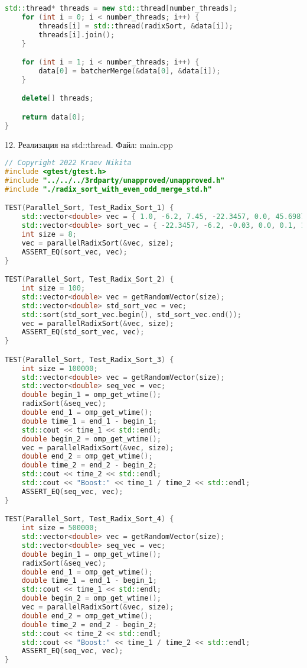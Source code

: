 \documentclass{report}
\begin{document}
\begin{lstlisting}[language=C++]
    std::thread* threads = new std::thread[number_threads];
    for (int i = 0; i < number_threads; i++) {
        threads[i] = std::thread(radixSort, &data[i]);
        threads[i].join();
    }

    for (int i = 1; i < number_threads; i++) {
        data[0] = batcherMerge(&data[0], &data[i]);
    }

    delete[] threads;

    return data[0];
}
\end{lstlisting}

\par 12. Реализация на std::thread. Файл: main.cpp

\begin{lstlisting}[language=C++]
// Copyright 2022 Kraev Nikita
#include <gtest/gtest.h>
#include "../../../3rdparty/unapproved/unapproved.h"
#include "./radix_sort_with_even_odd_merge_std.h"

TEST(Parallel_Sort, Test_Radix_Sort_1) {
    std::vector<double> vec = { 1.0, -6.2, 7.45, -22.3457, 0.0, 45.69876, -0.03, 0.1 };
    std::vector<double> sort_vec = { -22.3457, -6.2, -0.03, 0.0, 0.1, 1.0, 7.45, 45.69876 };
    int size = 8;
    vec = parallelRadixSort(&vec, size);
    ASSERT_EQ(sort_vec, vec);
}

TEST(Parallel_Sort, Test_Radix_Sort_2) {
    int size = 100;
    std::vector<double> vec = getRandomVector(size);
    std::vector<double> std_sort_vec = vec;
    std::sort(std_sort_vec.begin(), std_sort_vec.end());
    vec = parallelRadixSort(&vec, size);
    ASSERT_EQ(std_sort_vec, vec);
}

TEST(Parallel_Sort, Test_Radix_Sort_3) {
    int size = 100000;
    std::vector<double> vec = getRandomVector(size);
    std::vector<double> seq_vec = vec;
    double begin_1 = omp_get_wtime();
    radixSort(&seq_vec);
    double end_1 = omp_get_wtime();
    double time_1 = end_1 - begin_1;
    std::cout << time_1 << std::endl;
    double begin_2 = omp_get_wtime();
    vec = parallelRadixSort(&vec, size);
    double end_2 = omp_get_wtime();
    double time_2 = end_2 - begin_2;
    std::cout << time_2 << std::endl;
    std::cout << "Boost:" << time_1 / time_2 << std::endl;
    ASSERT_EQ(seq_vec, vec);
}

TEST(Parallel_Sort, Test_Radix_Sort_4) {
    int size = 500000;
    std::vector<double> vec = getRandomVector(size);
    std::vector<double> seq_vec = vec;
    double begin_1 = omp_get_wtime();
    radixSort(&seq_vec);
    double end_1 = omp_get_wtime();
    double time_1 = end_1 - begin_1;
    std::cout << time_1 << std::endl;
    double begin_2 = omp_get_wtime();
    vec = parallelRadixSort(&vec, size);
    double end_2 = omp_get_wtime();
    double time_2 = end_2 - begin_2;
    std::cout << time_2 << std::endl;
    std::cout << "Boost:" << time_1 / time_2 << std::endl;
    ASSERT_EQ(seq_vec, vec);
}


\end{lstlisting}
\end{document}
